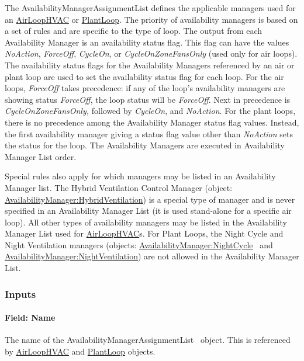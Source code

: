 The AvailabilityManagerAssignmentList defines the applicable managers used for an \hyperref[airloophvac]{AirLoopHVAC} or \hyperref[plantloop]{PlantLoop}. The priority of availability managers is based on a set of rules and are specific to the type of loop. The output from each Availability Manager is an availability status flag. This flag can have the values \emph{NoAction}, \emph{ForceOff}, \emph{CycleOn}, or \emph{CycleOnZoneFansOnly} (used only for air loops). The availability status flags for the Availability Managers referenced by an air or plant loop are used to set the availability status flag for each loop. For the air loops, \emph{ForceOff} takes precedence: if any of the loop's availability managers are showing status \emph{ForceOff}, the loop status will be \emph{ForceOff}. Next in precedence is \emph{CycleOnZoneFansOnly,} followed by \emph{CycleOn}, and \emph{NoAction}. For the plant loops, there is no precedence among the Availability Manager status flag values. Instead, the first availability manager giving a status flag value other than \emph{NoAction} sets the status for the loop. The Availability Managers are executed in Availability Manager List order.

Special rules also apply for which managers may be listed in an Availability Manager list. The Hybrid Ventilation Control Manager (object: \hyperref[availabilitymanagerhybridventilation]{AvailabilityManager:HybridVentilation}) is a special type of manager and is never specified in an Availability Manager List (it is used stand-alone for a specific air loop). All other types of availability managers may be listed in the Availability Manager List used for \hyperref[airloophvac]{AirLoopHVAC}s. For Plant Loops, the Night Cycle and Night Ventilation managers (objects: \hyperref[availabilitymanagernightcycle]{AvailabilityManager:NightCycle} ~and \hyperref[availabilitymanagernightventilation]{AvailabilityManager:NightVentilation}) are not allowed in the Availability Manager List.

\subsubsection{Inputs}\label{inputs-2-002}

\paragraph{Field: Name}\label{field-name-2-001}

The name of the AvailabilityManagerAssignmentList ~object. This is referenced by \hyperref[airloophvac]{AirLoopHVAC} and \hyperref[plantloop]{PlantLoop} objects.

